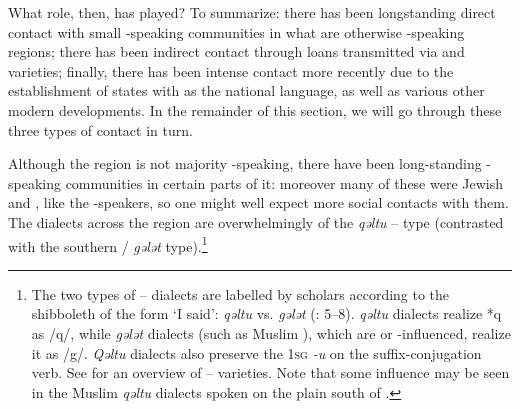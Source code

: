 \documentclass[output=paper]{langsci/langscibook}
\begin{document}
What role, then, has  played? To summarize: there has been longstanding direct contact with small -speaking communities in what are otherwise -speaking regions; there has been indirect contact through loans transmitted via  and  varieties; finally, there has been intense contact more recently due to the establishment of states with  as the national language, as well as various other modern developments. In the remainder of this section, we will go through these three types of contact in turn.

Although the region is not majority -speaking, there have been long-standing -speaking communities in certain parts of it: moreover many of these were Jewish and , like the -speakers, so one might well expect more social contacts with them. The  dialects across the region are overwhelmingly of the \textit{qəltu} – type (contrasted with the southern / \textit{gələt} type).\footnote{The two types of –  dialects are labelled by scholars according to the shibboleth of the form ‘I said’: \textit{qəltu} vs. \textit{gələt} (\citealt{Blanc1964}: 5–8). \textit{qəltu} dialects realize *q as /q/, while \textit{gələt} dialects (such as Muslim ), which are  or -influenced, realize it as /g/. \textit{Qəltu} dialects also preserve the 1\textsc{sg}  \textit{-u} on the suffix-conjugation verb. See \citet{Talay2011} for an overview of --  varieties. Note that some  influence may be seen in the Muslim \textit{qəltu} dialects spoken on the plain south of  \citep[30]{Jastrow1978}.}
\end{document}
